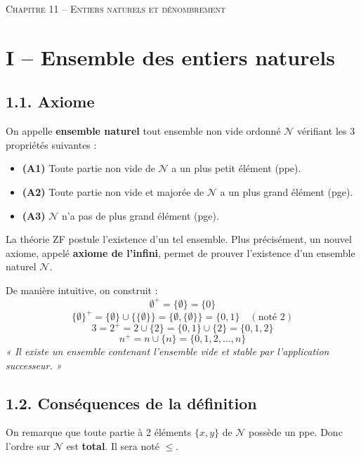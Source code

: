 \documentclass[a4paper,11pt]{article}
\newcommand{\mot}[1]{\textcolor{bordeaux}{\textbf{#1}}}
\begin{document}
\begin{center}
  {\Huge \scshape \color{bordeaux} Chapitre 11 -- Entiers naturels et dénombrement}
\end{center}
\vspace{10pt}

\section{I -- Ensemble des entiers naturels}

\subsection{1.1. Axiome}

\begin{definition}
On appelle \mot{ensemble naturel} tout ensemble non vide ordonné $\mathcal{N}$ vérifiant les 3 propriétés suivantes :
\begin{itemize}
    \item \textbf{(A1)} Toute partie non vide de $\mathcal{N}$ a un plus petit élément (ppe).
    \item \textbf{(A2)} Toute partie non vide et majorée de $\mathcal{N}$ a un plus grand élément (pge).
    \item \textbf{(A3)} $\mathcal{N}$ n'a pas de plus grand élément (pge).
\end{itemize}
\end{definition}

La théorie ZF postule l'existence d'un tel ensemble. Plus précisément, un nouvel axiome, appelé \mot{axiome de l'infini}, permet de prouver l'existence d'un ensemble naturel $\mathcal{N}$.

\vspace{10pt}
De manière intuitive, on construit :
\[
\emptyset^+ = \{\emptyset\} = \{0\}
\]
\[
\{\emptyset\}^+ = \{\emptyset\} \cup \{\{\emptyset\}\} = \{\emptyset, \{\emptyset\}\} = \{0, 1\} \quad (\text{noté } 2)
\]
\[
3 = 2^+ = 2 \cup \{2\} = \{0, 1\} \cup \{2\} = \{0, 1, 2\}
\]
\[
n^+ = n \cup \{n\} = \{0, 1, 2, \dots, n\}
\]
\textit{« Il existe un ensemble contenant l'ensemble vide et stable par l'application successeur. »}

\subsection{1.2. Conséquences de la définition}

\begin{remarque}
On remarque que toute partie à 2 éléments $\{x, y\}$ de $\mathcal{N}$ possède un ppe. Donc l'ordre sur $\mathcal{N}$ est \mot{total}. Il sera noté $\le$.
\end{remarque}
\end{document}
